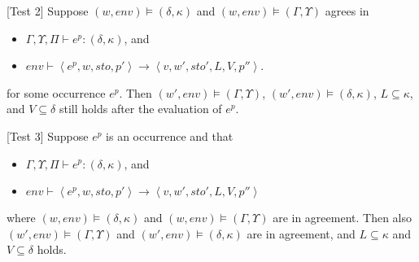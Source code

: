 \documentclass[../../master.tex]{subfiles}
\begin{document}
\begin{theorem}{[Test 2]}
	Suppose $(w,env)\models(\delta,\kappa)$ and $(w,env)\models(\Gamma,\Upsilon)$ agrees in
	\begin{itemize}
		\item $\Gamma,\Upsilon,\Pi\vdash e^p : (\delta,\kappa)$, and 
		\item $env\vdash\left\langle e^p,w,sto,p'\right\rangle\rightarrow\left\langle v,w',sto',L,V,p''\right\rangle$.
	\end{itemize}
	for some occurrence $e^p$.
	Then $(w',env)\models(\Gamma,\Upsilon)$, $(w',env)\models(\delta,\kappa)$, $L\subseteq\kappa$, and $V\subseteq\delta$ still holds after the evaluation of $e^p$.
\end{theorem}

\begin{theorem}{[Test 3]}
	Suppose $e^p$ is an occurrence and that
	\begin{itemize}
		\item $\Gamma,\Upsilon,\Pi\vdash e^p : (\delta,\kappa)$, and 
		\item $env\vdash\left\langle e^p,w,sto,p'\right\rangle\rightarrow\left\langle v,w',sto',L,V,p''\right\rangle$
	\end{itemize}
	where $(w,env)\models(\delta,\kappa)$ and $(w,env)\models(\Gamma,\Upsilon)$ are in agreement.
	Then also $(w',env)\models(\Gamma,\Upsilon)$ and $(w',env)\models(\delta,\kappa)$ are in agreement, and $L\subseteq\kappa$ and $V\subseteq\delta$ holds.
\end{theorem}
\fi
\end{document}
